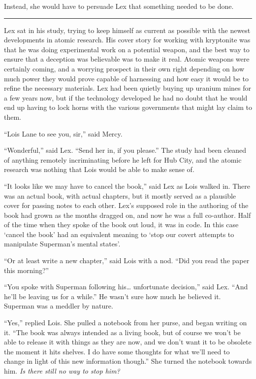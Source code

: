 \documentclass[ebook,12pt]{memoir}
\begin{document}
Instead, she would have to persuade Lex that something needed to be
done.

\begin{center}\rule{0.5\linewidth}{\linethickness}\end{center}

Lex sat in his study, trying to keep himself as current as possible with
the newest developments in atomic research. His cover story for working
with kryptonite was that he was doing experimental work on a potential
weapon, and the best way to ensure that a deception was believable was
to make it real. Atomic weapons were certainly coming, and a worrying
prospect in their own right depending on how much power they would prove
capable of harnessing and how easy it would be to refine the necessary
materials. Lex had been quietly buying up uranium mines for a few years
now, but if the technology developed he had no doubt that he would end
up having to lock horns with the various governments that might lay
claim to them.

``Lois Lane to see you, sir,'' said Mercy.

``Wonderful,'' said Lex. ``Send her in, if you please.'' The study had
been cleaned of anything remotely incriminating before he left for Hub
City, and the atomic research was nothing that Lois would be able to
make sense of.

``It looks like we may have to cancel the book,'' said Lex as Lois
walked in. There was an actual book, with actual chapters, but it mostly
served as a plausible cover for passing notes to each other. Lex's
supposed role in the authoring of the book had grown as the months
dragged on, and now he was a full co‐author. Half of the time when they
spoke of the book out loud, it was in code. In this case `cancel the
book' had an equivalent meaning to `stop our covert attempts to
manipulate Superman's mental states'.

``Or at least write a new chapter,'' said Lois with a nod. ``Did you
read the paper this morning?''

``You spoke with Superman following his\ldots{} unfortunate decision,''
said Lex. ``And he'll be leaving us for a while.'' He wasn't sure how
much he believed it. Superman was a meddler by nature.

``Yes,'' replied Lois. She pulled a notebook from her purse, and began
writing on it. ``The book was always intended as a living book, but of
course we won't be able to release it with things as they are now, and
we don't want it to be obsolete the moment it hits shelves. I do have
some thoughts for what we'll need to change in light of this new
information though.'' She turned the notebook towards him. \emph{Is
there still no way to stop him?}
\end{document}
